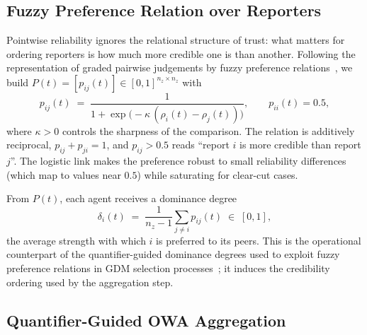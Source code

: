 \documentclass[preprint,11pt]{elsarticle}
\newcommand{\rel}{\rho}
\begin{document}
\subsection{Fuzzy Preference Relation over Reporters}
\label{sec:fpr}

Pointwise reliability ignores the relational structure of trust: what
matters for ordering reporters is how much more credible one is than
another. Following the representation of graded pairwise judgements by
fuzzy preference relations~\cite{chiclana1998,herreraviedma2002}, we
build $P(t)=[p_{ij}(t)]\in[0,1]^{n_z\times n_z}$ with
\begin{equation}
p_{ij}(t)\;=\;\frac{1}{1+\exp\!\big(-\kappa\,(\rel_i(t)-\rel_j(t))\big)},
\qquad p_{ii}(t)=0.5,
\label{eq:fpr}
\end{equation}
where $\kappa>0$ controls the sharpness of the comparison. The relation
is additively reciprocal, $p_{ij}+p_{ji}=1$, and $p_{ij}>0.5$ reads
``report $i$ is more credible than report $j$''. The logistic link
makes the preference robust to small reliability differences (which map
to values near $0.5$) while saturating for clear-cut cases.

From $P(t)$, each agent receives a dominance degree
\begin{equation}
\delta_i(t)\;=\;\frac{1}{n_z-1}\sum_{j\neq i} p_{ij}(t)\;\in\;[0,1],
\label{eq:dominance}
\end{equation}
the average strength with which $i$ is preferred to its peers. This is
the operational counterpart of the quantifier-guided dominance degrees
used to exploit fuzzy preference relations in GDM selection
processes~\cite{chiclana1998,herreraviedma2002}; it induces the
credibility ordering used by the aggregation step.

\subsection{Quantifier-Guided OWA Aggregation}
\label{sec:fprowa}
\end{document}
